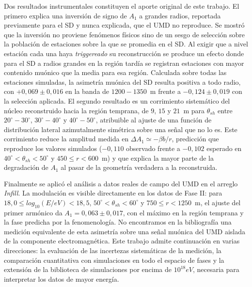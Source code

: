 \documentclass[spanish,a4paper,12pt]{book}
\begin{document}
	Dos resultados instrumentales constituyen el aporte original de este trabajo. El primero explica una inversión de signo de $A_1$ a grandes radios, reportada previamente para el SD y nunca explicada, que el UMD no reproduce. Se mostró que la inversión no proviene fenómenos físicos sino de un sesgo de selección sobre la población de estaciones sobre la que se promedia en el SD. Al exigir que a nivel estación cada una haya \textit{triggereado} su reconstrucción se produce un efecto donde para el SD a radios grandes en la región tardía se registran estaciones con mayor contenido muónico que la media para esa región. Calculada sobre todas las estaciones simuladas, la asimetría muónica del SD resulta positiva a todo radio, con $+0,069 \pm 0,016$ en la banda de $1200-1350$~m frente a $-0,124 \pm 0,019$ con la selección aplicada. El segundo resultado es un corrimiento sistemático del	núcleo reconstruido hacia la región temprana, de $9$, $15$ y $21$~m para $\theta_{sh}$ entre $20^\circ-30^\circ$, $30^\circ-40^\circ$ y $40^\circ-50^\circ$, atribuible al ajuste de una función de distribución lateral azimutalmente simétrica sobre una señal que no lo es. Este corrimiento reduce la amplitud medida en $\Delta A_1 \simeq -\beta b/r$, predicción que reproduce los valores simulados ($-0,110$ observado frente a $-0,102$ esperado en $40^\circ < \theta_{sh} < 50^\circ$ y $450 \leq r < 600$~m) y que explica la mayor parte de la degradación de $A_1$ al pasar de la geometría verdadera a la reconstruida.
	
	Finalmente se aplicó el análisis a datos reales de campo del UMD en el arreglo \textit{Infill}. La modulación es visible directamente en los datos de Fase II: para $18,0 \leq log_{10}(E/eV) < 18,5$, $50^\circ < \theta_{sh} < 60^\circ$ y $750 \leq r < 1250$~m, el
	ajuste del primer armónico da $A_1 = 0,063 \pm 0,017$, con el máximo en la región temprana y la fase predicha por la fenomenología. No encontramos en la bibliografía una medición equivalente de esta asimetría sobre una señal muónica del UMD aislada de la componente electromagnética. Este trabajo admite
	continuación en varias direcciones: la evaluación de las incertezas sistemáticas de la medición, la comparación cuantitativa con simulaciones en todo el espacio de fases y la extensión de la biblioteca de
	simulaciones por encima de $10^{18} eV$, necesaria para interpretar los datos de mayor energía.
	
	\clearpage
	\begingroup
	\pagestyle{plain}
	\thispagestyle{plain}
	\setlength{\parindent}{0pt}
	\setlength{\parskip}{0.2cm}
	
\end{document}
